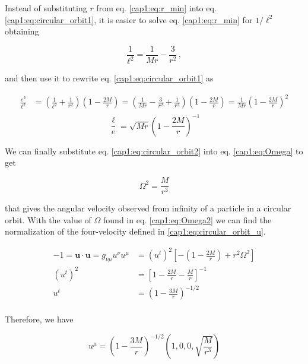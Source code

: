 Instead of substituting $r$ from eq. \ref{cap1:eq:r_min} into eq.
\ref{cap1:eq:circular_orbit1}, it is easier to solve eq. \ref{cap1:eq:r_min} for
$1 / \ell^2$ obtaining

\begin{equation}
    \frac{1}{\ell^2} = \frac{1}{M r} - \frac{3}{r^2} \, ,
\end{equation}

and then use it to rewrite eq. \ref{cap1:eq:circular_orbit1} as

\begin{align*}
    \frac{e^2}{\ell^2} &= \left(\frac{1}{\ell^2} + \frac{1}{r^2} \right)
    \left(1 - \frac{2M}{r}\right)
    = \left(\frac{1}{M r}
    - \frac{3}{r^2}
    + \frac{1}{r^2}\right)
    \left(1 - \frac{2M}{r}\right) 
    = \frac{1}{M r} \left(1
    - \frac{2 M}{r} \right)^2 \\
\end{align*}
\begin{equation}
    \frac{\ell}{e} = \sqrt{M r} \left(1
    - \frac{2 M}{r} \right)^{-1}
    \label{cap1:eq:circular_orbit2}
\end{equation}

We can finally substitute eq. \ref{cap1:eq:circular_orbit2} into eq.
\ref{cap1:eq:Omega} to get

\begin{equation}
    \Omega^2 = \frac{M}{r^3}
    \label{cap1:eq:Omega2}
\end{equation}

that gives the angular velocity observed from infinity of a particle in a
circular orbit.
With the value of $\Omega$ found in eq. \ref{cap1:eq:Omega2} we can find the
normalization of the four-velocity defined in \ref{cap1:eq:circular_orbit_u}.

\begin{align*}
    - 1 = \mathbf{u \cdot u} = g_{\nu \mu} u^\nu u^\mu
    &= (u^t)^2 \left[- \left(1 - \frac{2M}{r}\right) + r^2 \Omega^2 \right] \\
    (u^t)^2 &= \left[ 1 - \frac{2M}{r} - \frac{M}{r}\right]^{-1} \\
    u^t &= \left( 1 - \frac{3M}{r} \right)^{-1/2} \\
\end{align*}

Therefore, we have

\begin{equation}
    u^\mu = \left( 1 - \frac{3M}{r} \right)^{-1/2}
    \left( 1, 0, 0, \sqrt{\frac{M}{r^3}} \right)
\end{equation}


